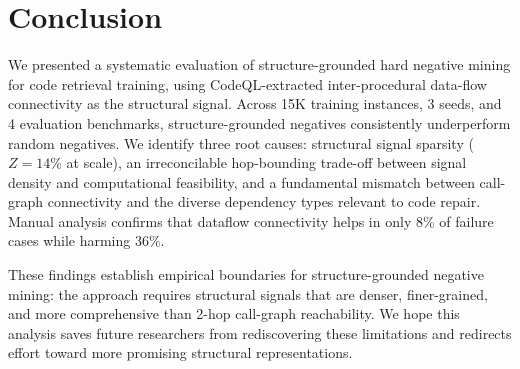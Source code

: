\documentclass[11pt]{article}
\begin{document}
\section{Conclusion}
\label{sec:conclusion}

We presented a systematic evaluation of structure-grounded hard negative mining for code retrieval training, using CodeQL-extracted inter-procedural data-flow connectivity as the structural signal. Across 15K training instances, 3 seeds, and 4 evaluation benchmarks, structure-grounded negatives consistently underperform random negatives. We identify three root causes: structural signal sparsity ($Z = 14\%$ at scale), an irreconcilable hop-bounding trade-off between signal density and computational feasibility, and a fundamental mismatch between call-graph connectivity and the diverse dependency types relevant to code repair. Manual analysis confirms that dataflow connectivity helps in only 8\% of failure cases while harming 36\%.

These findings establish empirical boundaries for structure-grounded negative mining: the approach requires structural signals that are denser, finer-grained, and more comprehensive than 2-hop call-graph reachability. We hope this analysis saves future researchers from rediscovering these limitations and redirects effort toward more promising structural representations.


\end{document}
